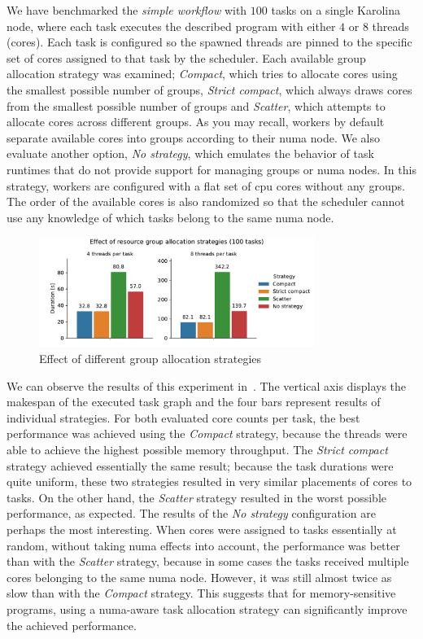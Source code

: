 We have benchmarked the \emph{simple workflow} with $100$ tasks on a single
Karolina node, where each task executes the described program with either $4$
or $8$ threads (cores). Each task is configured so the spawned threads are
pinned to the specific set of cores assigned to that task by the
scheduler. Each available group allocation strategy was
examined; \emph{Compact}, which tries to allocate cores using the smallest possible
number of groups, \emph{Strict compact}, which always draws cores from the smallest possible
number of groups and \emph{Scatter}, which attempts to allocate cores across different groups.
As you may recall,
\hyperqueue{} workers by default separate available cores into groups according to their
\gls{numa} node. We also evaluate another option, \emph{No strategy}, which
emulates the behavior of task runtimes that do not provide support for managing groups or
\gls{numa} nodes. In this strategy, workers are configured with a flat set of
\gls{cpu} cores without any groups. The order of the available cores is also
randomized so that the scheduler cannot use any knowledge of which tasks belong to the same
\gls{numa} node.

\begin{figure}[h]
	\centering
	\includegraphics[width=0.8\textwidth]{imgs/hq/charts/numa}
	\caption{Effect of different group allocation strategies}
	\label{fig:hq-numa}
\end{figure}

We can observe the results of this experiment in~. The vertical axis displays
the makespan of the executed task graph and the four bars represent results of individual
strategies. For both evaluated core counts per task, the best performance was achieved using the
\emph{Compact} strategy, because the threads were able to achieve the highest possible
memory throughput. The \emph{Strict compact} strategy achieved essentially the same result;
because the task durations were quite uniform, these two strategies resulted in very similar
placements of cores to tasks. On the other hand, the \emph{Scatter} strategy resulted in
the worst possible performance, as expected. The results of the \emph{No strategy}
configuration are perhaps the most interesting. When cores were assigned to tasks essentially at
random, without taking \gls{numa} effects into account, the performance was better
than with the \emph{Scatter} strategy, because in some cases the tasks received multiple
cores belonging to the same \gls{numa} node. However, it was still almost twice as
slow than with the \emph{Compact} strategy. This suggests that for memory-sensitive
programs, using a \gls{numa}-aware task allocation strategy can significantly improve
the achieved performance.


